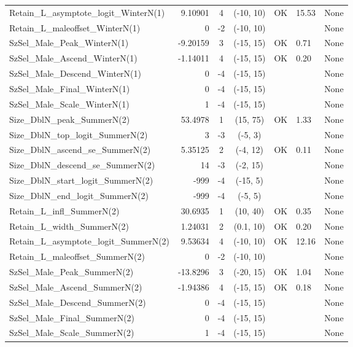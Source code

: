 \documentclass[12pt,]{article}
\begin{document}
\begin{landscape}
\begin{longtable}{lrcccll}
  Retain\_L\_asymptote\_logit\_WinterN(1) & 9.10901 & 4 & (-10, 10) & OK & 15.53 & None \\ 
  Retain\_L\_maleoffset\_WinterN(1) & 0 & -2 & (-10, 10) &  &  & None \\ 
  SzSel\_Male\_Peak\_WinterN(1) & -9.20159 & 3 & (-15, 15) & OK & 0.71 & None \\ 
  SzSel\_Male\_Ascend\_WinterN(1) & -1.14011 & 4 & (-15, 15) & OK & 0.20 & None \\ 
  SzSel\_Male\_Descend\_WinterN(1) & 0 & -4 & (-15, 15) &  &  & None \\ 
  SzSel\_Male\_Final\_WinterN(1) & 0 & -4 & (-15, 15) &  &  & None \\ 
  SzSel\_Male\_Scale\_WinterN(1) & 1 & -4 & (-15, 15) &  &  & None \\ 
  Size\_DblN\_peak\_SummerN(2) & 53.4978 & 1 & (15, 75) & OK & 1.33 & None \\ 
  Size\_DblN\_top\_logit\_SummerN(2) & 3 & -3 & (-5, 3) &  &  & None \\ 
  Size\_DblN\_ascend\_se\_SummerN(2) & 5.35125 & 2 & (-4, 12) & OK & 0.11 & None \\ 
  Size\_DblN\_descend\_se\_SummerN(2) & 14 & -3 & (-2, 15) &  &  & None \\ 
  Size\_DblN\_start\_logit\_SummerN(2) & -999 & -4 & (-15, 5) &  &  & None \\ 
  Size\_DblN\_end\_logit\_SummerN(2) & -999 & -4 & (-5, 5) &  &  & None \\ 
  Retain\_L\_infl\_SummerN(2) & 30.6935 & 1 & (10, 40) & OK & 0.35 & None \\ 
  Retain\_L\_width\_SummerN(2) & 1.24031 & 2 & (0.1, 10) & OK & 0.20 & None \\ 
  Retain\_L\_asymptote\_logit\_SummerN(2) & 9.53634 & 4 & (-10, 10) & OK & 12.16 & None \\ 
  Retain\_L\_maleoffset\_SummerN(2) & 0 & -2 & (-10, 10) &  &  & None \\ 
  SzSel\_Male\_Peak\_SummerN(2) & -13.8296 & 3 & (-20, 15) & OK & 1.04 & None \\ 
  SzSel\_Male\_Ascend\_SummerN(2) & -1.94386 & 4 & (-15, 15) & OK & 0.18 & None \\ 
  SzSel\_Male\_Descend\_SummerN(2) & 0 & -4 & (-15, 15) &  &  & None \\ 
  SzSel\_Male\_Final\_SummerN(2) & 0 & -4 & (-15, 15) &  &  & None \\ 
  SzSel\_Male\_Scale\_SummerN(2) & 1 & -4 & (-15, 15) &  &  & None \\ 

\end{longtable}
\end{landscape}
\end{document}
